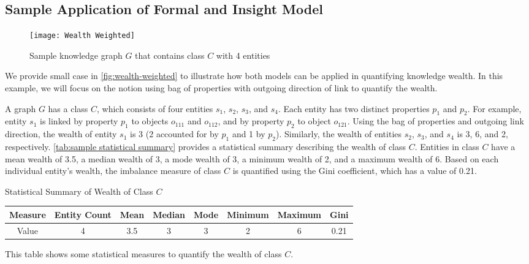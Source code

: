 \subsection{Sample Application of Formal and Insight Model}

\begin{figure}[!htbp]
    \centering
    \texttt{[image: Wealth Weighted]}
    \caption{Sample knowledge graph \(G\) that contains class \(C\) with 4 entities} \label{fig:wealth-weighted}
\end{figure}

We provide small case in \autoref{fig:wealth-weighted} to illustrate how both models can be applied in quantifying knowledge wealth. In this example, we will focus on the notion using bag of properties with outgoing direction of link to quantify the wealth.

A graph \(G\) has a class \(C\), which consists of four entities \(s_1\), \(s_2\), \(s_3\), and \(s_4\). Each entity has two distinct properties \(p_1\) and \(p_2\). For example, entity \(s_1\) is linked by property \(p_1\) to objects \(o_{111}\) and \(o_{112}\), and by property \(p_2\) to object \(o_{121}\). Using the bag of properties and outgoing link direction, the wealth of entity \(s_1\) is 3 (2 accounted for by \(p_1\) and 1 by \(p_2\)). Similarly, the wealth of entities \(s_2\), \(s_3\), and \(s_4\) is 3, 6, and 2, respectively. \autoref{tab:sample statistical summary} provides a statistical summary describing the wealth of class \(C\). Entities in class \(C\) have a mean wealth of 3.5, a median wealth of 3, a mode wealth of 3, a minimum wealth of 2, and a maximum wealth of 6. Based on each individual entity's wealth, the imbalance measure of class \(C\) is quantified using the Gini coefficient, which has a value of 0.21.

\begin{center}
    \small
    \begin{threeparttable}
    \caption{Statistical Summary of Wealth of Class \(C\)}
    \label{tab:sample statistical summary}
    \begin{tabular}{c | c c c c c c c} 
    
    \toprule
        Measure & Entity Count & Mean & Median & Mode & Minimum & Maximum & Gini \\ [0.5ex] 
    \midrule
        Value & 4 & 3.5 & 3 & 3 & 2 & 6 & 0.21 \\
        [0.5ex]
    \bottomrule
    \end{tabular}
    \begin{tablenotes}
        \footnotesize
        \item{This table shows some statistical measures to quantify the wealth of class \(C\).}
    \end{tablenotes}
    \end{threeparttable}
\end{center}

